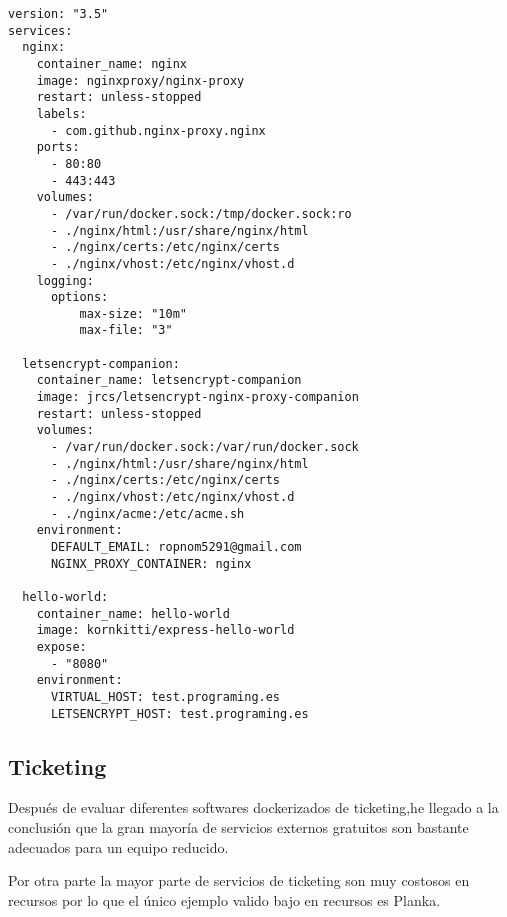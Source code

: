 \begin{lstlisting}[style=yaml, caption={docker-compose.yml Ngix proxy y Let's Encrypt prueba de concepto.}, label={lst:https_ngix} ]
version: "3.5"
services:
  nginx:
    container_name: nginx
    image: nginxproxy/nginx-proxy
    restart: unless-stopped
    labels: 
      - com.github.nginx-proxy.nginx
    ports:
      - 80:80
      - 443:443
    volumes:
      - /var/run/docker.sock:/tmp/docker.sock:ro
      - ./nginx/html:/usr/share/nginx/html
      - ./nginx/certs:/etc/nginx/certs
      - ./nginx/vhost:/etc/nginx/vhost.d
    logging:
      options:
          max-size: "10m"
          max-file: "3"

  letsencrypt-companion:
    container_name: letsencrypt-companion
    image: jrcs/letsencrypt-nginx-proxy-companion
    restart: unless-stopped
    volumes:
      - /var/run/docker.sock:/var/run/docker.sock
      - ./nginx/html:/usr/share/nginx/html
      - ./nginx/certs:/etc/nginx/certs
      - ./nginx/vhost:/etc/nginx/vhost.d
      - ./nginx/acme:/etc/acme.sh
    environment:
      DEFAULT_EMAIL: ropnom5291@gmail.com
      NGINX_PROXY_CONTAINER: nginx

  hello-world:
    container_name: hello-world
    image: kornkitti/express-hello-world
    expose:
      - "8080"
    environment:
      VIRTUAL_HOST: test.programing.es
      LETSENCRYPT_HOST: test.programing.es
\end{lstlisting}

\subsection{Ticketing}
Después de evaluar diferentes softwares dockerizados de ticketing,he llegado a la conclusión que la gran mayoría de servicios externos gratuitos son bastante adecuados para  un equipo reducido.

Por otra parte la mayor parte de servicios de ticketing son muy costosos en recursos por lo que el único ejemplo valido bajo en recursos es Planka\cite{c_planka}.

